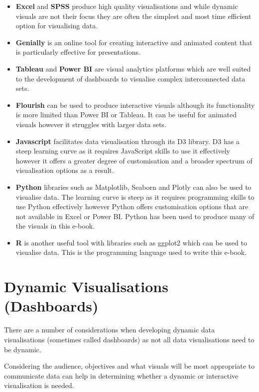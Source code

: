 \documentclass[
]{book}
\providecommand{\tightlist}{%
  \setlength{\itemsep}{0pt}\setlength{\parskip}{0pt}}
\begin{document}
\begin{itemize}
\tightlist
\item
  \textbf{Excel} and \textbf{SPSS} produce high quality visualisations and while dynamic visuals are not their focus they are often the simplest and most time efficient option for visualising data.
\item
  \textbf{Genially} is an online tool for creating interactive and animated content that is particularly effective for presentations.
\item
  \textbf{Tableau} and \textbf{Power BI} are visual analytics platforms which are well suited to the development of dashboards to visualise complex interconnected data sets.
\item
  \textbf{Flourish} can be used to produce interactive visuals although its functionality is more limited than Power BI or Tableau. It can be useful for animated visuals however it struggles with larger data sets.
\item
  \textbf{Javascript} facilitates data visualisation through its D3 library. D3 has a steep learning curve as it requires JavaScript skills to use it effectively however it offers a greater degree of customisation and a broader spectrum of visualisation options as a result.
\item
  \textbf{Python} libraries such as Matplotlib, Seaborn and Plotly can also be used to visualise data. The learning curve is steep as it requires programming skills to use Python effectively however Python offers customisation options that are not available in Excel or Power BI. Python has been used to produce many of the visuals in this e-book.
\item
  \textbf{R} is another useful tool with libraries such as ggplot2 which can be used to visualise data. This is the programming language used to write this e-book.
\end{itemize}

\hypertarget{dynamic-visualisations-dashboards}{%
\section{Dynamic Visualisations (Dashboards)}\label{dynamic-visualisations-dashboards}}

There are a number of considerations when developing dynamic data visualisations (sometimes called dashboards) as not all data visualisations need to be dynamic.

Considering the audience, objectives and what visuals will be most appropriate to communicate data can help in determining whether a dynamic or interactive visualisation is needed.
\end{document}
